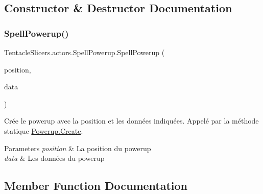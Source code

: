 \subsection{Constructor \& Destructor Documentation}
\mbox{\label{class_tentacle_slicers_1_1actors_1_1_spell_powerup_ab43025670bf0f9234fea53c559cd1b1d}} 
\subsubsection{\texorpdfstring{Spell\+Powerup()}{SpellPowerup()}}
{\footnotesize\ttfamily Tentacle\+Slicers.\+actors.\+Spell\+Powerup.\+Spell\+Powerup (\begin{DoxyParamCaption}\item[{\hyperlink{class_tentacle_slicers_1_1general_1_1_point}{Point}}]{position,  }\item[{\hyperlink{class_tentacle_slicers_1_1actors_1_1_powerup_data}{Powerup\+Data}}]{data }\end{DoxyParamCaption})}



Crée le powerup avec la position et les données indiquées. Appelé par la méthode statique \hyperlink{class_tentacle_slicers_1_1actors_1_1_powerup_a170bfc9101d384a73957470249458cfc}{Powerup.\+Create}. 


\begin{DoxyParams}{Parameters}
{\em position} & La position du powerup \\
\hline
{\em data} & Les données du powerup \\
\hline
\end{DoxyParams}


\subsection{Member Function Documentation}
\mbox{\label{class_tentacle_slicers_1_1actors_1_1_spell_powerup_ad779a4a5ca4ccb8895f40f8a5f64dad3}} 
